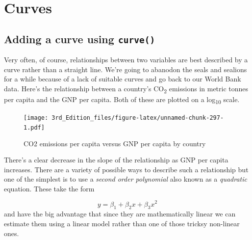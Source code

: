 \documentclass[
]{book}
\newenvironment{Shaded}{\begin{snugshade}}{\end{snugshade}}
\newcommand{\DataTypeTok}[1]{\textcolor[rgb]{0.13,0.29,0.53}{#1}}
\newcommand{\KeywordTok}[1]{\textcolor[rgb]{0.13,0.29,0.53}{\textbf{#1}}}
\newcommand{\NormalTok}[1]{#1}
\newcommand{\OperatorTok}[1]{\textcolor[rgb]{0.81,0.36,0.00}{\textbf{#1}}}
\newcommand{\StringTok}[1]{\textcolor[rgb]{0.31,0.60,0.02}{#1}}
\begin{document}
\hypertarget{curves}{%
\section{Curves}\label{curves}}

\hypertarget{adding-a-curve-using-curve}{%
\subsection{\texorpdfstring{Adding a curve using \texttt{curve()}}{Adding a curve using curve()}}\label{adding-a-curve-using-curve}}

Very often, of course, relationships between two variables are best described by a curve rather than a straight line. We're going to abanodon the seals and sealions for a while because of a lack of suitable curves and go back to our World Bank data. Here's the relationship between a country's CO\textsubscript{2} emissions in metric tonnes per capita and the GNP per capita. Both of these are plotted on a log\textsubscript{10} scale.

\begin{Shaded}
\end{Shaded}

\begin{figure}
\centering
\texttt{[image: 3rd\_Edition\_files/figure-latex/unnamed-chunk-297-1.pdf]}
\caption{\label{fig:unnamed-chunk-297}CO2 emissions per capita versus GNP per capita by country}
\end{figure}

There's a clear decrease in the slope of the relationship as GNP per capita increases. There are a variety of possible ways to describe such a relationship but one of the simplest is to use a \emph{second order polynomial} also known as a \emph{quadratic} equation. These take the form

\[ y = \beta _{1} + \beta_{2}x + \beta_{3}x^{2} \]
and have the big advantage that since they are mathematically linear we can estimate them using a linear model rather than one of those tricksy non-linear ones.
\end{document}
